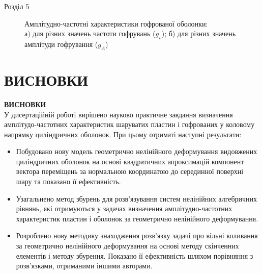 \documentclass[handout, 8pt]{beamer}
\numberwithin{figure}{section}
\numberwithin{equation}{section}
\numberwithin{table}{section}
\begin{document}
\begin{frame}{Розділ 5}
\begin{figure}[h]
\begin{minipage}[h]{0.49\linewidth}
\end{minipage}
\caption{Амплітудно-частотні характеристики гофрованої оболонки: \\а) для різних значень частоти гофрувань ($g_v$); б) для різних значень амплітуди гофрування ($g_A$)}
\end{figure}
\end{frame}


\section{ВИСНОВКИ}
\begin{frame}
\textbf{\large ВИСНОВКИ}
\\
\vspace{0.2em}
У дисертаційній роботі вирішено науково практичне завдання визначення амплітудо-частотних характеристик шаруватих пластин і гофрованих у коловому напрямку циліндричних оболонок. При цьому отриматі наступні результати:
\begin{itemize}
\item Побудовано нову модель геометрично нелінійного деформування видовжених циліндричних оболонок на основі квадратичних апроксимацій компонент вектора переміщень за нормальною координатою до серединної поверхні шару та показано її ефективність.
\item Узагальнено метод збурень для розв'язування систем нелінійних алгебричних рівнянь, які отримуються у задачах визначення амплітудно-частотних характеристик пластин і оболонок за геометрично нелінійного деформування.
\item Розроблено нову методику знаходження розв’язку задачі про вільні коливання за геометрично нелінійного деформування на основі методу скінченних елементів і методу збурення. Показано її ефективність шляхом порівняння з розв'язками, отриманими іншими авторами.
\end{itemize}
\end{frame}
\end{document}
